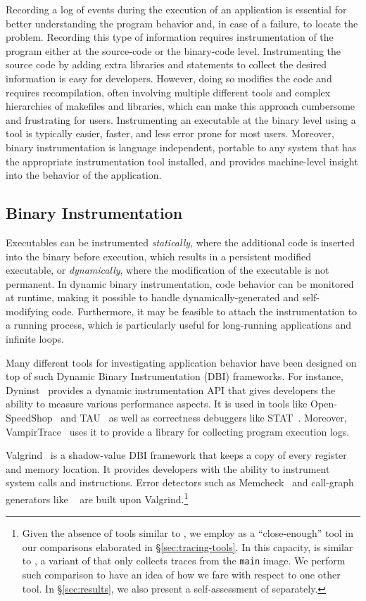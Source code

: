 Recording a log of events during the execution of an application is essential for better understanding the program behavior and, in case of a failure, to locate the problem.
%
Recording this type of information requires instrumentation of the program either at the source-code or the binary-code level.
%
Instrumenting the source code by adding extra libraries and statements to collect the desired information is easy for developers.
%
However, doing so modifies the code and requires recompilation, often involving multiple different tools and complex hierarchies of makefiles and libraries, which can make this approach cumbersome and frustrating for users.
%
Instrumenting an executable at the binary level using a tool is typically easier, faster, and less error prone for most users.
%
Moreover, binary instrumentation is language independent, portable to any system that has the appropriate instrumentation tool installed, and provides machine-level insight into the behavior of the application.
%

\subsection{Binary Instrumentation}
Executables can be instrumented \textit{statically}, where the additional code is inserted into the binary before execution, which results in a persistent modified executable, or \textit{dynamically}, where the modification of the executable is not permanent. In dynamic binary instrumentation, code behavior can be monitored at runtime, making it possible to handle dynamically-generated and self-modifying code. Furthermore, it may be feasible to attach the instrumentation to a running process, which is particularly useful for long-running applications and infinite loops.

Many different tools for investigating application behavior have been designed on top of such Dynamic Binary Instrumentation (DBI) frameworks. For instance, Dyninst~\cite{dyninst} provides a dynamic instrumentation API that gives developers the ability to measure various performance aspects. It is used in tools like Open-SpeedShop~\cite{openss} and TAU~\cite{tau} as well as correctness debuggers like STAT~\cite{stat}. Moreover, VampirTrace~\cite{vampirt} uses it to provide a library for collecting program execution logs. 

Valgrind~\cite{valgrind} is a shadow-value DBI framework that keeps a copy of every register and memory location. It provides developers with the ability to instrument system calls and instructions. Error detectors such as Memcheck~\cite{memcheck} and call-graph generators like \callgrind~\cite{callgrind} are built upon Valgrind.\footnote{Given the absence of tools similar to \parlot, we employ \callgrind
 as a ``close-enough'' tool in our comparisons elaborated in \S\ref{sec:tracing-tools}.
 In this capacity, \callgrind is similar to \parlotm, a variant of \parlot that only collects
 traces from the {\tt main} image. We perform such comparison to have an idea of how we fare
 with respect to one other tool. In \S\ref{sec:results}, we also present a self-assessment of \parlot separately.}


